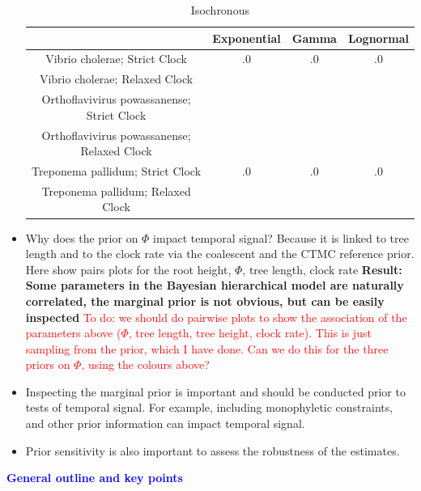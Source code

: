 \documentclass[11pt]{article}
\begin{document}
\begin{itemize}
        \begin{table}[H]
        \caption{Isochronous}
        \begin{center}
        \begin{tabular}{ c | c c c }
         & Exponential & Gamma & Lognormal \\ 
        \hline
        Vibrio cholerae; Strict Clock & .0 & .0 & .0 \\  
        Vibrio cholerae; Relaxed Clock &  &  &  \\   
        Orthoflavivirus powassanense; Strict Clock &  &  &  \\  
        Orthoflavivirus powassanense; Relaxed Clock &  &  &  \\   
        Treponema pallidum; Strict Clock & .0 & .0 & .0 \\  
        Treponema pallidum; Relaxed Clock &  &  & 
        \end{tabular}
        \end{center}
        \end{table}
    
	\item Why does the prior on $\Phi$ impact temporal signal? Because it is linked to tree length and to the clock rate via the coalescent and the CTMC reference prior. Here show pairs plots for the root height, $\Phi$, tree length, clock rate \textbf{Result: Some parameters in the Bayesian hierarchical model are naturally correlated, the marginal prior is not obvious, but can be easily inspected}
            \subitem \textcolor{red}{To do: we should do pairwise plots to show the association of the parameters above ($\Phi$, tree length, tree height, clock rate). This is just sampling from the prior, which I have done. Can we do this for the three priors on $\Phi$, using the colours above?}   
        
	\item Inspecting the marginal prior is important and should be conducted prior to tests of temporal signal. For example, including monophyletic constraints, and other prior information can impact temporal signal. 
	\item Prior sensitivity is also important to assess the robustness of the estimates.
 
\end{itemize}

\Large{\textbf{\textcolor{blue}{General outline and key points}}}
\end{document}
